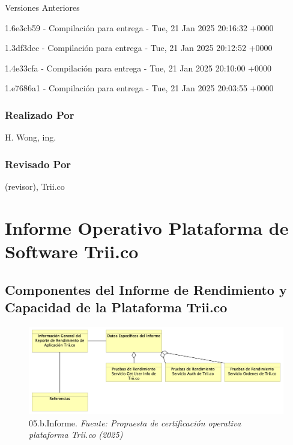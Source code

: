 \documentclass[
  paper=a4,
  ,captions=tableheading
]{scrartcl}
\renewenvironment{quote}{\begin{customblockquote}\list{}{\rightmargin=0em\leftmargin=0em}%
\item\relax\color{blockquote-text}\ignorespaces}{\unskip\unskip\endlist\end{customblockquote}}
\begin{document}
Versiones Anteriores

1.6e3cb59 - Compilación para entrega - Tue, 21 Jan 2025 20:16:32 +0000

1.3df3dcc - Compilación para entrega - Tue, 21 Jan 2025 20:12:52 +0000

1.4e33cfa - Compilación para entrega - Tue, 21 Jan 2025 20:10:00 +0000

1.e7686a1 - Compilación para entrega - Tue, 21 Jan 2025 20:03:55 +0000

\subsubsection{Realizado Por}\label{sec:realizado-por}

H. Wong, ing.

\subsubsection{Revisado Por}\label{sec:revisado-por}

(revisor), Trii.co

\newpage

\section{Informe Operativo Plataforma de Software
Trii.co}\label{sec:informe-operativo-plataforma-de-software-trii.co}

\subsection{Componentes del Informe de Rendimiento y Capacidad de la
Plataforma
Trii.co}\label{sec:componentes-del-informe-de-rendimiento-y-capacidad-de-la-plataforma-trii.co}

\begin{quote}
\end{quote}

\begin{figure}
\centering
\includegraphics{images/05.b.Informe.png}
\caption{05.b.Informe. \emph{Fuente: Propuesta de certificación
operativa plataforma Trii.co
(2025)}}\label{fig:id-04abc8f16f354757a52791da825e4049}
\end{figure}
\end{document}
